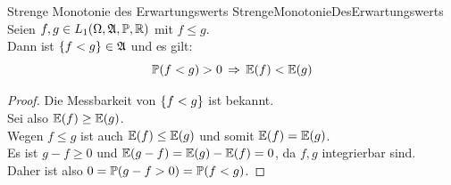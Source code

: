 \begin{lemma}{Strenge Monotonie des Erwartungswerts}
             {StrengeMonotonieDesErwartungswerts}
Seien $f,g\in L_1(\Omega,\mathfrak{A},\mathbb{P}, \mathbb{R})$ mit $f \le g$.\\
Dann ist $\left\{f < g\right\}\in \mathfrak{A}$ und es gilt:
\[\mathbb{P}(f < g)>0 \, \Rightarrow \, \mathbb{E}(f) < \mathbb{E}(g)\]
\end{lemma}
\begin{proof}
Die Messbarkeit von $\left\{f < g\right\}$ ist bekannt.\\
Sei also $\mathbb{E}(f) \ge \mathbb{E}(g)$.\\
Wegen $f \le g$ ist auch $\mathbb{E}(f) \le \mathbb{E}(g)$ und somit $\mathbb{E}(f) = \mathbb{E}(g)$.\\
Es ist $g-f\ge 0$ und $\mathbb{E}(g-f)=\mathbb{E}(g) -\mathbb{E}(f) = 0$, da $f,g$ integrierbar sind.\\
Daher ist also $0 = \mathbb{P}(g-f > 0) = \mathbb{P}(f < g)$.
\end{proof}